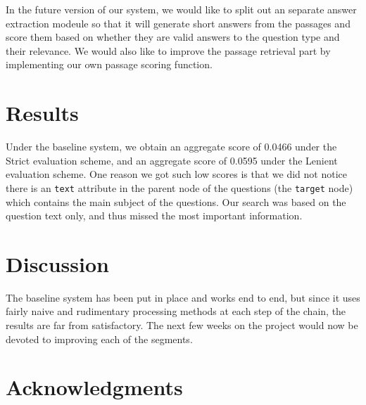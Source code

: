 \documentclass[11pt]{article}
\begin{document}
In the future version of our system, we would like to split out an separate answer extraction modeule so that it will generate short answers from the passages and score them based on whether they are valid answers to the question type and their relevance. We would also like to improve the passage retrieval part by implementing our own passage scoring function.

\section{Results}

Under the baseline system, we obtain an aggregate score of 0.0466 under the Strict evaluation scheme, and an aggregate score of 0.0595 under the Lenient evaluation scheme.
One reason we got such low scores is that we did not notice there is an \texttt{text} attribute in the parent node of the questions (the \texttt{target} node) which contains the main subject of the questions. Our search was based on the question text only, and thus missed the most important information.

\section{Discussion}
\label{sec:discussion}

The baseline system has been put in place and works end to end, but since it uses fairly naive and rudimentary processing methods at each step of the chain, the results are far from satisfactory. The next few weeks on the project would now be devoted to improving each of the segments. 
\section*{Acknowledgments}


\printbibliography 
\end{document}

